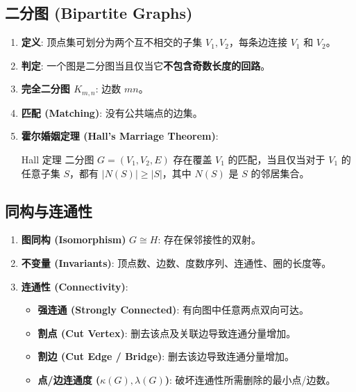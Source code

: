 \documentclass[a4paper,12pt]{ctexart}
\begin{document}
\subsection{二分图 (Bipartite Graphs)}
\begin{enumerate}
    \item \textbf{定义}: 顶点集可划分为两个互不相交的子集 $V_1, V_2$，每条边连接 $V_1$ 和 $V_2$。
    \item \textbf{判定}: 一个图是二分图当且仅当它\textbf{不包含奇数长度的回路}。
    \item \textbf{完全二分图 $K_{m,n}$}: 边数 $mn$。
    \item \textbf{匹配 (Matching)}: 没有公共端点的边集。
    \item \textbf{霍尔婚姻定理 (Hall's Marriage Theorem)}:
    \begin{mythm}{Hall 定理}{}
    二分图 $G=(V_1, V_2, E)$ 存在覆盖 $V_1$ 的匹配，当且仅当对于 $V_1$ 的任意子集 $S$，都有 $|N(S)| \ge |S|$，其中 $N(S)$ 是 $S$ 的邻居集合。
    \end{mythm}
\end{enumerate}

\subsection{同构与连通性}
\begin{enumerate}
    \item \textbf{图同构 (Isomorphism)} $G \cong H$: 存在保邻接性的双射。
    \item \textbf{不变量 (Invariants)}: 顶点数、边数、度数序列、连通性、圈的长度等。
    \item \textbf{连通性 (Connectivity)}:
    \begin{itemize}
        \item \textbf{强连通 (Strongly Connected)}: 有向图中任意两点双向可达。
        \item \textbf{割点 (Cut Vertex)}: 删去该点及关联边导致连通分量增加。
        \item \textbf{割边 (Cut Edge / Bridge)}: 删去该边导致连通分量增加。
        \item \textbf{点/边连通度 ($\kappa(G), \lambda(G)$)}: 破坏连通性所需删除的最小点/边数。
    \end{itemize}
\end{enumerate}
\end{document}
